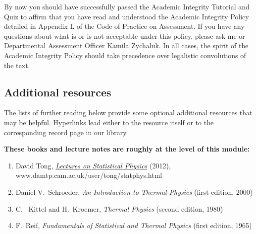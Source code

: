 \documentclass[12 pt]{article} %
\begin{document}
By now you should have successfully passed the Academic Integrity Tutorial and Quiz to affirm that you have read and understood the Academic Integrity Policy detailed in Appendix L of the Code of Practice on Assessment.
If you have any questions about what is or is not acceptable under this policy, please ask me or Departmental Assessment Officer Kamila Zychaluk.
In all cases, the spirit of the Academic Integrity Policy should take precedence over legalistic convolutions of the text.



\subsection*{Additional resources}
The lists of further reading below provide some optional additional resources that may be helpful.
Hyperlinks lead either to the resource itself or to the corresponding record page in our library.

\noindent\textbf{These books and lecture notes are roughly at the level of this module:} \\[-24 pt]
\begin{enumerate}
  \item David Tong, \href{https://www.damtp.cam.ac.uk/user/tong/statphys.html}{\textit{Lectures on Statistical Physics}} (2012), \\ www.damtp.cam.ac.uk/user/tong/statphys.html
  \item Daniel V.~Schroeder, \textit{An Introduction to Thermal Physics} (first edition, 2000)
  \item C.~ Kittel and H.~Kroemer, \textit{Thermal Physics} (second edition, 1980)
  \item F.~Reif, \textit{Fundamentals of Statistical and Thermal Physics} (first edition, 1965)
\end{enumerate}
\end{document}
